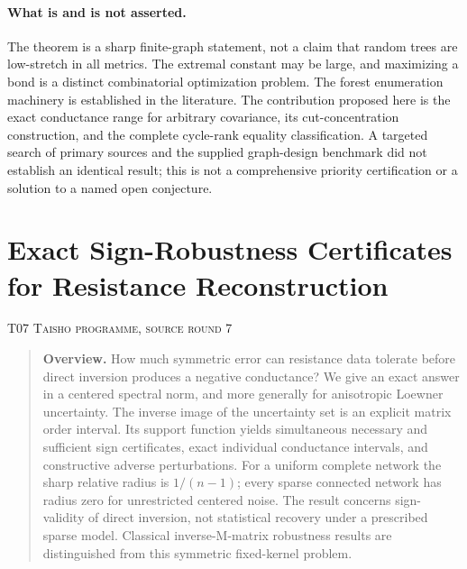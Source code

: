 \documentclass[11pt,a4paper]{article}
\theoremstyle{definition}\newtheorem{definition}[theorem]{Definition}
\theoremstyle{remark}\newtheorem{remark}[theorem]{Remark}
\numberwithin{equation}{section}
\begin{document}
\paragraph{What is and is not asserted.}
The theorem is a sharp finite-graph statement, not a claim that random trees are low-stretch in all metrics. The extremal constant may be large, and maximizing a bond is a distinct combinatorial optimization problem. The forest enumeration machinery is established in the literature. The contribution proposed here is the exact conductance range for arbitrary covariance, its cut-concentration construction, and the complete cycle-rank equality classification. A targeted search of primary sources \cite{ref045,ref046,ref047} and the supplied graph-design benchmark did not establish an identical result; this is not a comprehensive priority certification or a solution to a named open conjecture.





\clearpage
\section[T07 --- Exact Sign-Robustness Certificates for Resistance Reconstruction]{Exact Sign-Robustness Certificates for Resistance Reconstruction}\label{contrib-T07}
\noindent\textsc{T07 \quad Taisho programme, source round 7}\par\medskip



\begin{quote}\small\textbf{Overview.} How much symmetric error can resistance data tolerate before direct inversion produces a negative conductance? We give an exact answer in a centered spectral norm, and more generally for anisotropic Loewner uncertainty. The inverse image of the uncertainty set is an explicit matrix order interval. Its support function yields simultaneous necessary and sufficient sign certificates, exact individual conductance intervals, and constructive adverse perturbations. For a uniform complete network the sharp relative radius is $1/(n-1)$; every sparse connected network has radius zero for unrestricted centered noise. The result concerns sign-validity of direct inversion, not statistical recovery under a prescribed sparse model. Classical inverse-M-matrix robustness results are distinguished from this symmetric fixed-kernel problem.\end{quote}
\end{document}
